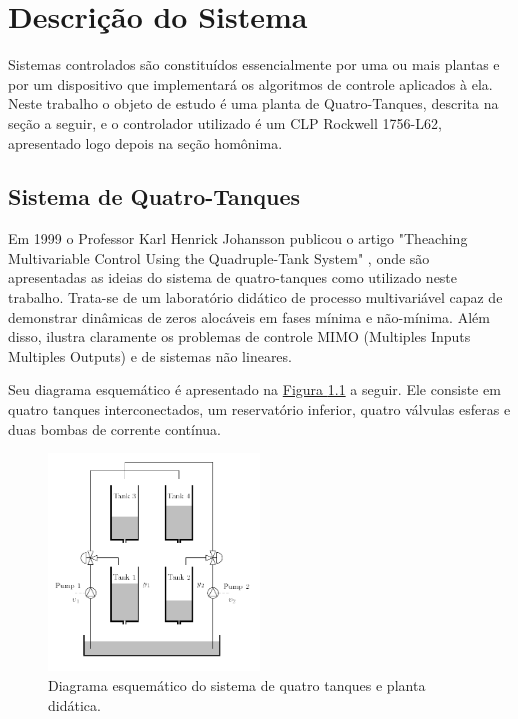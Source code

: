 %

\chapter{Descrição do Sistema}
\indent 

Sistemas controlados são constituídos essencialmente por uma ou mais plantas e por um dispositivo que implementará os algoritmos de controle aplicados à ela. Neste trabalho o objeto de estudo é uma planta de Quatro-Tanques, descrita na seção a seguir, e o controlador utilizado é um CLP Rockwell 1756-L62, apresentado logo depois na seção homônima.

\section{Sistema de Quatro-Tanques}
Em 1999 o Professor Karl Henrick Johansson publicou o artigo "Theaching Multivariable Control Using the Quadruple-Tank System" \cite{johansson2}, onde são apresentadas as ideias do sistema de quatro-tanques como utilizado neste trabalho. Trata-se de um laboratório didático de processo multivariável capaz de demonstrar dinâmicas de zeros alocáveis em fases mínima e não-mínima. Além disso, ilustra claramente os problemas de controle MIMO (Multiples Inputs Multiples Outputs) e de sistemas não lineares.

Seu diagrama esquemático é apresentado na  \hyperref[figDesc4tank]{Figura \ref{figDesc4tank}} a seguir. Ele consiste em quatro tanques interconectados, um reservatório inferior, quatro válvulas esferas e duas bombas de corrente contínua.

\begin{figure}[H]
	\centering
	\includegraphics[width=0.5\textwidth]{img/4tank.png}
	\caption{\label{figDesc4tank}Diagrama esquemático do sistema de quatro tanques e planta didática.}
\end{figure}

